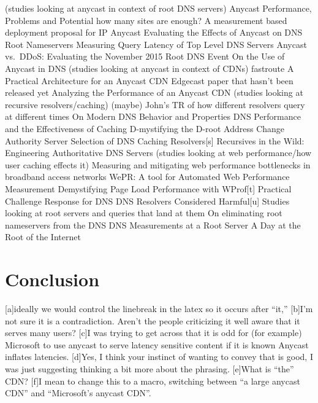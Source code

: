 \documentclass[sigconf,letterpaper,nonacm,10pt]{acmart}
\begin{document}
(studies looking at anycast in context of root DNS servers) Anycast
Performance, Problems and Potential how many sites are enough? A
measurement based deployment proposal for IP Anycast Evaluating the
Effects of Anycast on DNS Root Nameservers Measuring Query Latency of
Top Level DNS Servers Anycast vs.~DDoS: Evaluating the November 2015
Root DNS Event On the Use of Anycast in DNS (studies looking at anycast
in context of CDNs) fastroute A Practical Architecture for an Anycast
CDN Edgecast paper that hasn't been released yet Analyzing the
Performance of an Anycast CDN (studies looking at recursive
resolvers/caching) (maybe) John's TR of how different resolvers query at
different times On Modern DNS Behavior and Properties DNS Performance
and the Effectiveness of Caching D-mystifying the D-root Address Change
Authority Server Selection of DNS Caching Resolvers{[}s{]} Recursives in
the Wild: Engineering Authoritative DNS Servers (studies looking at web
performance/how user caching effects it) Measuring and mitigating web
performance bottlenecks in broadband access networks WePR: A tool for
Automated Web Performance Measurement Demystifying Page Load Performance
with WProf{[}t{]} Practical Challenge Response for DNS DNS Resolvers
Considered Harmful{[}u{]} Studies looking at root servers and queries
that land at them On eliminating root nameservers from the DNS DNS
Measurements at a Root Server A Day at the Root of the Internet

\fi

\hypertarget{conclusion-1}{%
\section{Conclusion}\label{conclusion-1}}

{[}a{]}ideally we would control the linebreak in the latex so it occurs
after ``it,'' {[}b{]}I'm not sure it is a contradiction. Aren't the
people criticizing it well aware that it serves many users? {[}c{]}I was
trying to get across that it is odd for (for example) Microsoft to use
anycast to serve latency sensitive content if it is known Anycast
inflates latencies. {[}d{]}Yes, I think your instinct of wanting to
convey that is good, I was just suggesting thinking a bit more about the
phrasing. {[}e{]}What is ``the'' CDN? {[}f{]}I mean to change this to a
macro, switching between ``a large anycast CDN'' and ``Microsoft's
anycast CDN''.
\end{document}
